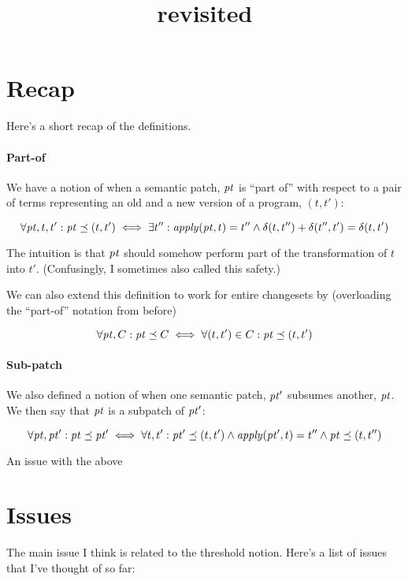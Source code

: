 \documentclass{article}
\title{\prg{spdiff} revisited}
\begin{document}
\maketitle

\section{Recap}

Here's a short recap of the definitions.

\paragraph{Part-of}

We have a notion of when a semantic patch, $\mathit{pt}$ is ``part of'' with
respect to a pair of terms representing an old and a new version of a
program, $(t,t')$:

\[\forall \mathit{pt},t,t':
\mathit{pt}\preceq (t,t') \iff \exists t'':
\mathit{apply}(\mathit{pt},t)=t'' \wedge \delta(t,t'') + \delta(t'',t') = \delta(t,t')
\]

The intuition is that $\mathit{pt}$ should somehow perform part of the
transformation of $t$ into $t'$. (Confusingly, I sometimes also called
this safety.)

We can also extend this definition to work for entire changesets by
(overloading the ``part-of'' notation from before)

\[\forall \mathit{pt}, C:
\mathit{pt}\preceq C \iff \forall(t,t') \in C:\mathit{pt}\preceq (t,t')
\]

\paragraph{Sub-patch}

We also defined a notion of when one semantic patch, $\mathit{pt}'$ subsumes
another, $\mathit{pt}$. We then say that $\mathit{pt}$
is a subpatch of $\mathit{pt}'$:

\[\forall \mathit{pt},\mathit{pt}':
\mathit{pt}\preceq \mathit{pt}' \iff \forall t,t' : 
\mathit{pt}'\preceq (t,t') \wedge
\mathit{apply}(\mathit{pt}',t) = t'' \wedge
\mathit{pt}\preceq (t,t'')
\]

An issue with the above 

\section{Issues}


The main issue I think is related to the threshold notion. Here's a
list of issues that I've thought of so far:
\end{document}
